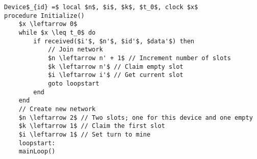 \begin{minipage}{\linewidth} %
\begin{lstlisting}[label=lst:setup,style=pseudocode,mathescape=true,caption={Pseudocode example of the special case procedure Initialize()}] 
Device$_{id} =$ local $n$, $i$, $k$, $t_0$, clock $x$
procedure Initialize()
    $x \leftarrow 0$
    while $x \leq t_0$ do
        if received($i'$, $n'$, $id'$, $data'$) then
            // Join network
            $n \leftarrow n' + 1$ // Increment number of slots
            $k \leftarrow n'$ // Claim empty slot
            $i \leftarrow i'$ // Get current slot
            goto loopstart
        end
    end
    // Create new network
    $n \leftarrow 2$ // Two slots; one for this device and one empty
    $k \leftarrow 1$ // Claim the first slot
    $i \leftarrow 1$ // Set turn to mine
    loopstart:
    mainLoop()
\end{lstlisting}   
\end{minipage}
